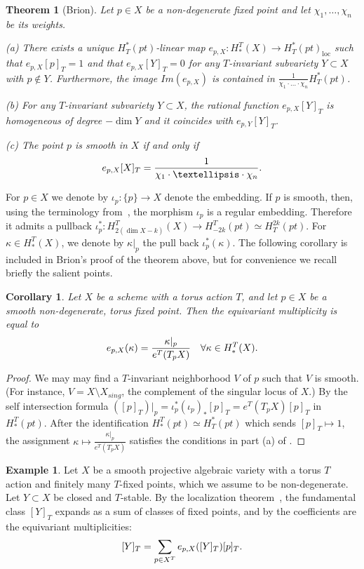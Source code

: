 \documentclass[11pt]{article}
\newtheorem{theorem}[theo]{Theorem}
\newtheorem{corol}[theo]{Corollary}
\theoremstyle{definition}
\newtheorem{example}[theo]{Example}
\numberwithin{equation}{section}
\DeclareMathOperator{\loc}{loc}
\begin{document}
\begin{theorem}[Brion]\label{thm:def-eq-m}  Let $p \in X$ be a non-degenerate fixed point and let $\chi_1, 
	\ldots, \chi_n$ be its weights. 
	
	(a) There exists a unique $H^*_T(pt)$-linear map $e_{p,X}: H_*^T(X) \to H^*_T(pt)_{\loc}$ such that 
	$e_{p,X}[p]_T =1$ and that $e_{p,X}[Y]_T = 0$ for any $T$-invariant subvariety $Y \subset X$ with $p \notin Y$. Furthermore, the image $Im(e_{p,X})$ is 
	contained in {$\frac{1}{\chi_1 \cdot \ldots \cdot \chi_n} H^*_T(pt)$}.
	
	(b) For any $T$-invariant subvariety $Y \subset X$, the rational function $e_{p,X}[Y]_T$
	is homogeneous of degree $-\dim Y$ and it coincides with $e_{p,Y}[Y]_T$.
	
	(c) The point $p$ is smooth in $X$ if and only if
	\[ e_{p,X}[X]_T =\frac{1}{\chi_1 \cdot \ldots \cdot \chi_n} \/. \]
	
\end{theorem}
{For $p \in X$ we denote by $\iota_p : \{ p \} \to X$ denote the embedding. If 
	$p$ is smooth, then, using the terminology from~\cite[\S B.7]{fulton:IT}, the morphism $\iota_p$ is a
	regular embedding. Therefore it admits a pullback 
	$\iota_p^*:H_{2(\dim X - k)}^T(X) \to H_{-2k}^T(pt) \simeq H^{2k}_T(pt)$. 
	For $\kappa \in H_*^T(X)$, we denote by $\kappa|_p$ the pull back $\iota_p^*(\kappa)$.
	The following corollary is included in Brion's proof of the theorem above, 
	but for convenience we recall briefly the salient points.}  
\begin{corol}\label{cor:eqmultsmooth} Let $X$ be a scheme with a torus action $T$, and let 
	$p \in X$ be a smooth non-degenerate, torus fixed point. Then the equivariant multiplicity is equal to
	\[ e_{p,X}(\kappa) = \frac{\kappa|_p}{e^T (T_p X) } \quad \forall \kappa \in H_*^T(X) \/. \]
\end{corol}
\begin{proof} We may 
	may find a $T$-invariant neighborhood $V$ of $p$ such that $V$ is smooth.
	(For instance, $V = X \setminus X_{sing}$, the complement of the singular locus of $X$.)
	By the self intersection formula $([p]_T)|_p= \iota_p^* (\iota_p)_*[p]_T = e^T (T_p X)[p]_T$ 
	in $H_*^T(pt)$. After the identification $H_*^T(pt) \simeq H^*_T(pt)$ which sends 
		$[p]_T \mapsto 1$, the assignment $\kappa \mapsto \frac{\kappa|_p}{e^T (T_p X) }$ 
		satisfies the conditions in part (a) of .
\end{proof}
{\begin{example} Let $X$ be a smooth projective
		algebraic variety with a torus $T$ action and finitely many $T$-fixed points,
		which we assume to be non-degenerate. Let $Y \subset X$ be closed and $T$-stable.
		By the localization theorem~\cite[Thm.~2]{edidin-graham:localization},
		the fundamental class $[Y]_T$ expands as a sum of classes of fixed points, and by
		 the coefficients are
		the equivariant multiplicities:
		\[ [Y]_T = \sum_{p \in X^T} e_{p,X}([Y]_T) [p]_T \/. \]
\end{example}}
\end{document}
